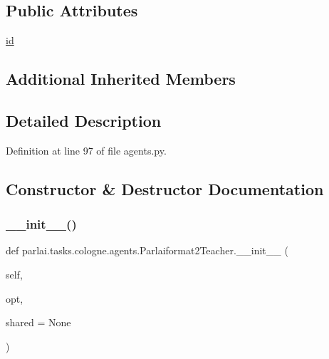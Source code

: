 \subsection*{Public Attributes}
\begin{DoxyCompactItemize}
\item 
\hyperlink{classparlai_1_1tasks_1_1cologne_1_1agents_1_1Parlaiformat2Teacher_a1d6efc35132bbec962c47ae5797ce329}{id}
\end{DoxyCompactItemize}
\subsection*{Additional Inherited Members}


\subsection{Detailed Description}


Definition at line 97 of file agents.\+py.



\subsection{Constructor \& Destructor Documentation}
\mbox{\label{classparlai_1_1tasks_1_1cologne_1_1agents_1_1Parlaiformat2Teacher_a6e9079898209456df94741e7780aa0c7}} 
\subsubsection{\texorpdfstring{\+\_\+\+\_\+init\+\_\+\+\_\+()}{\_\_init\_\_()}}
{\footnotesize\ttfamily def parlai.\+tasks.\+cologne.\+agents.\+Parlaiformat2\+Teacher.\+\_\+\+\_\+init\+\_\+\+\_\+ (\begin{DoxyParamCaption}\item[{}]{self,  }\item[{}]{opt,  }\item[{}]{shared = {\ttfamily None} }\end{DoxyParamCaption})}



